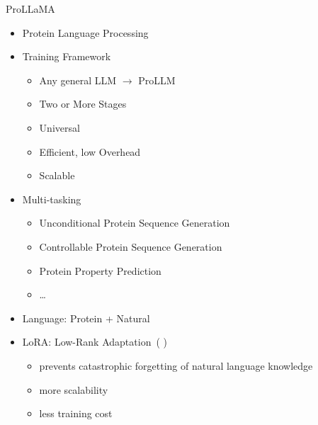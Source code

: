 \documentclass[dvipsnames,
hyperref={
	citecolor=blue,
	colorlinks=true,
	urlcolor=blue,
	linkcolor=,
}
]{beamer}
\let\oldcite\cite
\renewcommand{\cite}[1]{{\color{blue} \oldcite{#1}}}
\begin{document}

\begin{frame}{ProLLaMA}
	\begin{itemize}
		\item Protein Language Processing
		\item Training Framework
		\begin{itemize}
			\item Any general LLM $\rightarrow$ ProLLM
			\item Two or More Stages
			\item Universal
			\item Efficient, low Overhead
			\item Scalable
		\end{itemize}
		\item Multi-tasking
		\begin{itemize}
			\item Unconditional Protein Sequence Generation
			\item Controllable Protein Sequence Generation
			\item Protein Property Prediction
			\item \dots
		\end{itemize}
		\item Language: Protein + Natural
		\item %
		LoRA: Low-Rank Adaptation~(\cite{hu2021lora})
		\begin{itemize}
			\item prevents catastrophic forgetting of natural language knowledge
			\item more scalability
			\item less training cost
		\end{itemize}
	\end{itemize}
\end{frame}




\end{document}
